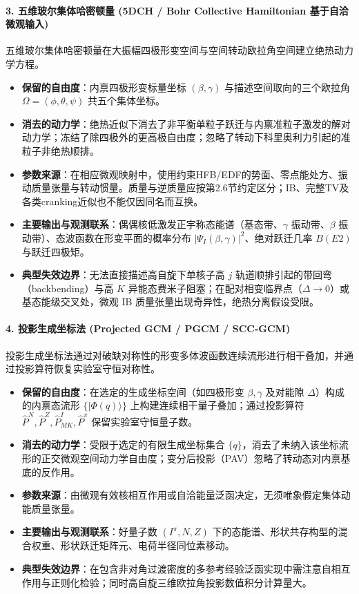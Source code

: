 \paragraph{3. 五维玻尔集体哈密顿量 (5DCH / Bohr Collective Hamiltonian 基于自洽微观输入)}
五维玻尔集体哈密顿量在大振幅四极形变空间与空间转动欧拉角空间建立绝热动力学方程。\cite{prochniak-rohozinski-2009-bohr-collective-hamiltonian}
\begin{itemize}
\item \textbf{保留的自由度}：内禀四极形变标量坐标 $(\beta, \gamma)$ 与描述空间取向的三个欧拉角 $\Omega = (\phi, \theta, \psi)$ 共五个集体坐标。
\item \textbf{消去的动力学}：绝热近似下消去了非平衡单粒子跃迁与内禀准粒子激发的解对动力学；冻结了除四极外的更高极自由度；忽略了转动下科里奥利力引起的准粒子非绝热顺排。
\item \textbf{参数来源}：在相应微观映射中，使用约束HFB/EDF的势面、零点能处方、振动质量张量与转动惯量。质量与逆质量应按第2.6节约定区分；IB、完整TV及各类cranking近似也不能仅因同名而互换。
\item \textbf{主要输出与观测联系}：偶偶核低激发正宇称态能谱（基态带、$\gamma$ 振动带、$\beta$ 振动带）、态波函数在形变平面的概率分布 $|\Psi_I(\beta, \gamma)|^2$、绝对跃迁几率 $B(E2)$ 与跃迁四极矩。
\item \textbf{典型失效边界}：无法直接描述高自旋下单核子高 $j$ 轨道顺排引起的带回弯（backbending）与高 $K$ 异能态费米子阻塞；在配对相变临界点（$\Delta \to 0$）或基态能级交叉处，微观 IB 质量张量出现奇异性，绝热分离假设受限。
\end{itemize}

\paragraph{4. 投影生成坐标法 (Projected GCM / PGCM / SCC-GCM)}
投影生成坐标法通过对破缺对称性的形变多体波函数连续流形进行相干叠加，并通过投影算符恢复实验室守恒对称性。\cite{heyde-wood-2011-shape-coexistence-review,prochniak-rohozinski-2009-bohr-collective-hamiltonian}
\begin{itemize}
\item \textbf{保留的自由度}：在选定的生成坐标空间（如四极形变 $\beta, \gamma$ 及对能隙 $\Delta$）构成的内禀态流形 $\{|\Phi(q)\rangle\}$ 上构建连续相干量子叠加；通过投影算符 $\hat{P}^N, \allowbreak \hat{P}^Z, \allowbreak \hat{P}^I_{MK}, \allowbreak \hat{P}^\pi$ 保留实验室守恒量子数。
\item \textbf{消去的动力学}：受限于选定的有限生成坐标集合 $\{q\}$，消去了未纳入该坐标流形的正交微观空间动力学自由度；变分后投影（PAV）忽略了转动态对内禀基底的反作用。
\item \textbf{参数来源}：由微观有效核相互作用或自洽能量泛函决定，无须唯象假定集体动能质量张量。
\item \textbf{主要输出与观测联系}：好量子数 $(I^\pi, N, Z)$ 下的态能谱、形状共存构型的混合权重、形状跃迁矩阵元、电荷半径同位素移动。
\item \textbf{典型失效边界}：在包含非对角过渡密度的多参考经验泛函实现中需注意自相互作用与正则化检验；同时高自旋三维欧拉角投影数值积分计算量大。
\end{itemize}

